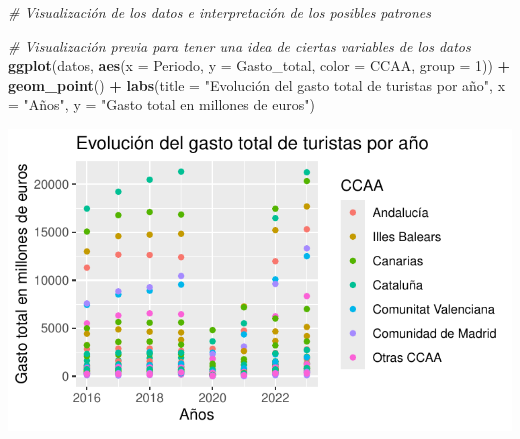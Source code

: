 \documentclass[data,article,submit,moreauthors,pdftex]{Definitions/mdpi}
\newenvironment{Shaded}{\begin{snugshade}}{\end{snugshade}}
\newcommand{\AttributeTok}[1]{\textcolor[rgb]{0.13,0.29,0.53}{#1}}
\newcommand{\CommentTok}[1]{\textcolor[rgb]{0.56,0.35,0.01}{\textit{#1}}}
\newcommand{\DecValTok}[1]{\textcolor[rgb]{0.00,0.00,0.81}{#1}}
\newcommand{\FunctionTok}[1]{\textcolor[rgb]{0.13,0.29,0.53}{\textbf{#1}}}
\newcommand{\NormalTok}[1]{#1}
\newcommand{\SpecialCharTok}[1]{\textcolor[rgb]{0.81,0.36,0.00}{\textbf{#1}}}
\newcommand{\StringTok}[1]{\textcolor[rgb]{0.31,0.60,0.02}{#1}}
\begin{document}
\begin{Shaded}
\begin{Highlighting}[]
\CommentTok{\# Visualización de los datos e interpretación de los posibles patrones}

\CommentTok{\# Visualización previa para tener una idea de ciertas variables de los datos}
\FunctionTok{ggplot}\NormalTok{(datos, }\FunctionTok{aes}\NormalTok{(}\AttributeTok{x =}\NormalTok{ Periodo, }\AttributeTok{y =}\NormalTok{ Gasto\_total, }\AttributeTok{color =}\NormalTok{ CCAA, }\AttributeTok{group =} \DecValTok{1}\NormalTok{)) }\SpecialCharTok{+}
  \FunctionTok{geom\_point}\NormalTok{() }\SpecialCharTok{+}
  \FunctionTok{labs}\NormalTok{(}\AttributeTok{title =} \StringTok{"Evolución del gasto total de turistas por año"}\NormalTok{, }\AttributeTok{x  =} \StringTok{"Años"}\NormalTok{, }\AttributeTok{y =} \StringTok{"Gasto total en millones de euros"}\NormalTok{)}
\end{Highlighting}
\end{Shaded}

\includegraphics{ProyectoAED2024_Rmd_files/figure-latex/unnamed-chunk-21-1.pdf}

\begin{Shaded}
\end{Shaded}
\end{document}
